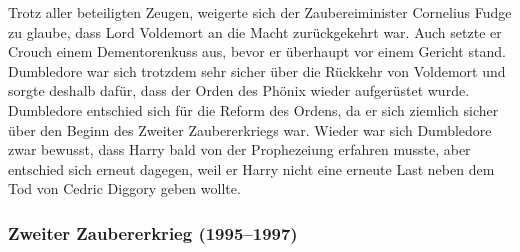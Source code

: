 \documentclass[a4paper, 10pt]{article}
\begin{document}
\vspace{10pt}
\newline
Trotz aller beteiligten Zeugen, weigerte sich der Zaubereiminister Cornelius Fudge zu glaube, dass Lord Voldemort an die Macht zurückgekehrt war. Auch setzte er Crouch einem Dementorenkuss aus, bevor er überhaupt vor einem Gericht stand. Dumbledore war sich trotzdem sehr sicher über die Rückkehr von Voldemort und sorgte deshalb dafür, dass der Orden des Phönix wieder aufgerüstet wurde. Dumbledore entschied sich für die Reform des Ordens, da er sich ziemlich sicher über den Beginn des Zweiter Zaubererkriegs war.
\vspace{10pt}
\newline
Wieder war sich Dumbledore zwar bewusst, dass Harry bald von der Prophezeiung erfahren musste, aber entschied sich erneut dagegen, weil er Harry nicht eine erneute Last neben dem Tod von Cedric Diggory geben wollte.



\subsubsection*{\large Zweiter Zaubererkrieg (1995–1997)}
\end{document}
